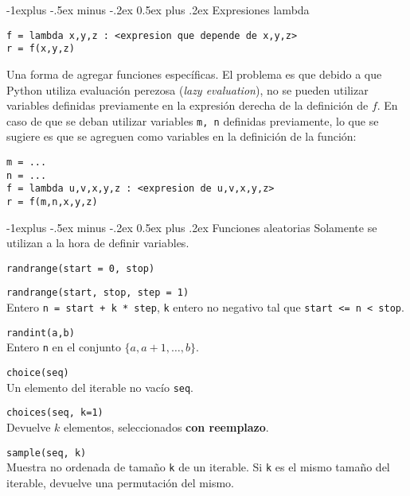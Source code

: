 \documentclass[10pt,landscape]{article}
\makeatletter
\renewcommand{\subsection}{\@startsection{subsection}{2}{0mm}%
                                {-1explus -.5ex minus -.2ex}%
                                {0.5ex plus .2ex}%
                                {\normalfont\normalsize\bfseries}}
\makeatother
\begin{document}
\begin{multicols}{3}
\subsection{Expresiones lambda}
\begin{verbatim}
f = lambda x,y,z : <expresion que depende de x,y,z>
r = f(x,y,z)
\end{verbatim}
Una forma de agregar funciones espec\'ificas. El problema es que debido a que Python utiliza evaluaci\'on perezosa (\emph{lazy evaluation}), no se pueden utilizar variables definidas previamente en la expresi\'on derecha de la definici\'on de $f$. En caso de que se deban utilizar variables \verb|m, n| definidas previamente, lo que se sugiere es que se agreguen como variables en la definici\'on de la funci\'on:
\begin{verbatim}
m = ...
n = ...
f = lambda u,v,x,y,z : <expresion de u,v,x,y,z>
r = f(m,n,x,y,z)
\end{verbatim}

\subsection{Funciones aleatorias}
Solamente se utilizan a la hora de definir variables.

\begin{asparaitem}
  \item \verb|randrange(start = 0, stop)|
  \item \verb|randrange(start, stop, step = 1)| \\
\quad Entero \verb|n = start + k * step|, \verb|k| entero no negativo tal que \verb|start <= n < stop|.
  \smallskip

\item \verb|randint(a,b)| \\
  \quad Entero \verb|n| en el conjunto $\{a, a+1, \dots, b\}$.
  \smallskip

\item   \verb|choice(seq)| \\
\quad Un elemento del iterable no vacío \verb|seq|.
  \smallskip

\item   \verb|choices(seq, k=1)| \\
  \quad Devuelve $k$ elementos, seleccionados \textbf{con reemplazo}.
  \smallskip

\item   \verb|sample(seq, k)| \\
\quad Muestra no ordenada de tamaño \verb|k| de un iterable. Si \verb|k| es el mismo tamaño del iterable, devuelve una permutación del mismo.
  \smallskip


\end{asparaitem}
\end{multicols}
\end{document}
